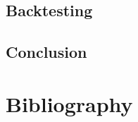 \documentclass[11pt,a4paper]{article}
\begin{document}
    
    \subsection{Backtesting}
    
    \subsection{Conclusion}
    
    \newpage
    \section{Bibliography}
    
    
\end{document}
